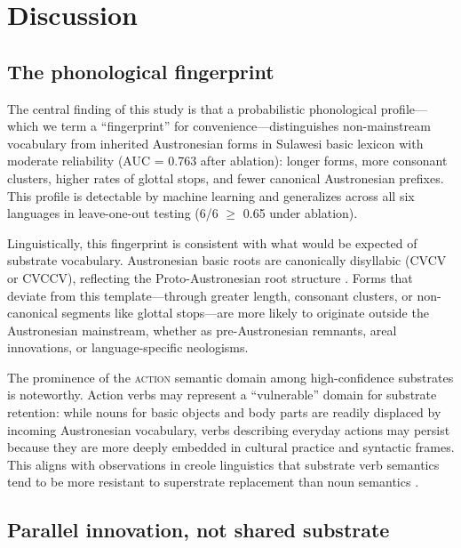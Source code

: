 \documentclass[12pt]{article}
\begin{document}
\section{Discussion}

\subsection{The phonological fingerprint}

The central finding of this study is that a probabilistic phonological profile---which we term a ``fingerprint'' for convenience---distinguishes non-mainstream vocabulary from inherited Austronesian forms in Sulawesi basic lexicon with moderate reliability (AUC = 0.763 after ablation): longer forms, more consonant clusters, higher rates of glottal stops, and fewer canonical Austronesian prefixes.
This profile is detectable by machine learning and generalizes across all six languages in leave-one-out testing (6/6 $\geq$ 0.65 under ablation).

Linguistically, this fingerprint is consistent with what would be expected of substrate vocabulary.
Austronesian basic roots are canonically disyllabic (CVCV or CVCCV), reflecting the Proto-Austronesian root structure \citep{blust2009}.
Forms that deviate from this template---through greater length, consonant clusters, or non-canonical segments like glottal stops---are more likely to originate outside the Austronesian mainstream, whether as pre-Austronesian remnants, areal innovations, or language-specific neologisms.

The prominence of the \textsc{action} semantic domain among high-confidence substrates is noteworthy.
Action verbs may represent a ``vulnerable'' domain for substrate retention: while nouns for basic objects and body parts are readily displaced by incoming Austronesian vocabulary, verbs describing everyday actions may persist because they are more deeply embedded in cultural practice and syntactic frames.
This aligns with observations in creole linguistics that substrate verb semantics tend to be more resistant to superstrate replacement than noun semantics \citep{lefebvre2004, thomason1988}.

\subsection{Parallel innovation, not shared substrate}
\end{document}
